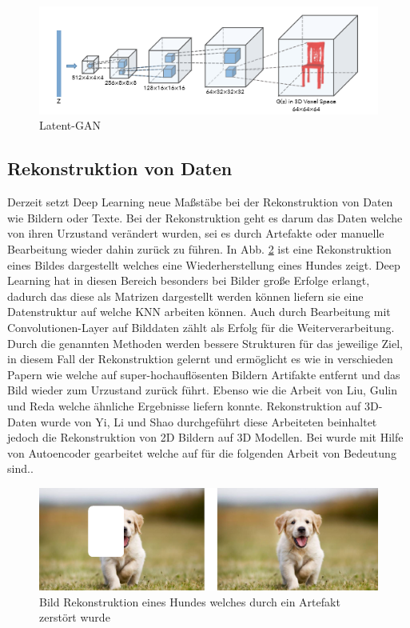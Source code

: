 \documentclass{llncs}
\begin{document}
\begin{figure}[htbp] 
	\centering
	\includegraphics[width=1.2\textwidth]{3dgan.png}
	\caption{Latent-GAN}
	\label{fig:Bild30}
\end{figure}
\cite{3d}

\subsection{Rekonstruktion von Daten}

Derzeit setzt Deep Learning neue Maßstäbe bei der Rekonstruktion von Daten wie Bildern oder Texte. Bei der Rekonstruktion geht es darum das Daten welche von ihren Urzustand verändert wurden, sei es durch Artefakte oder manuelle Bearbeitung wieder dahin zurück zu führen. In Abb. \ref{fig:Bild40} ist eine Rekonstruktion eines Bildes dargestellt welches eine Wiederherstellung eines Hundes zeigt. Deep Learning hat in diesen Bereich besonders bei Bilder große Erfolge erlangt, dadurch das diese als Matrizen dargestellt werden können liefern sie eine Datenstruktur auf welche KNN arbeiten können. Auch durch Bearbeitung mit Convolutionen-Layer auf Bilddaten zählt als Erfolg für die Weiterverarbeitung\cite{imagerecon}. Durch die genannten Methoden werden bessere Strukturen für das jeweilige Ziel, in diesem Fall der Rekonstruktion gelernt und ermöglicht es wie in verschieden Papern wie \cite{imagere1}  welche auf super-hochauflösenten Bildern Artifakte entfernt und das Bild wieder zum Urzustand zurück führt.
Ebenso wie die Arbeit von Liu, Gulin und Reda \cite{imagere2} welche ähnliche Ergebnisse liefern konnte. Rekonstruktion auf 3D-Daten wurde von Yi, Li und Shao \cite{3d_recon} durchgeführt diese Arbeiteten beinhaltet jedoch die Rekonstruktion von 2D Bildern auf 3D Modellen. Bei wurde mit Hilfe von Autoencoder gearbeitet welche auf für die folgenden Arbeit von Bedeutung sind.\cite{3d_recon}. 

\begin{figure}[htbp] 
	\centering
	\includegraphics[width=1.2\textwidth]{imagere.png}
	\caption{Bild Rekonstruktion eines Hundes welches durch ein Artefakt zerstört wurde}
	\label{fig:Bild40}
\end{figure}
\end{document}

